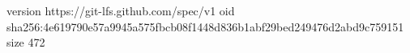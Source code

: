 version https://git-lfs.github.com/spec/v1
oid sha256:4e619790e57a9945a575fbcb08f1448d836b1abf29bed249476d2abd9c759151
size 472
